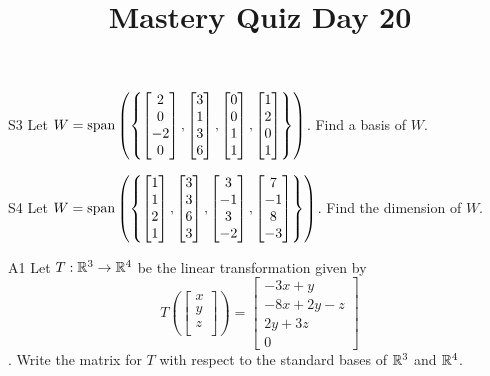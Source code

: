 \documentclass{sbgLAquiz}
\title{Mastery Quiz Day 20 }
\begin{document}
\begin{problem}{S3}
Let $W={\rm span}\left(\left\{\begin{bmatrix} 2 \\ 0 \\ -2 \\ 0 \end{bmatrix}, \begin{bmatrix} 3 \\ 1 \\ 3 \\ 6 \end{bmatrix}, \begin{bmatrix} 0 \\ 0 \\ 1 \\ 1 \end{bmatrix}, \begin{bmatrix}1 \\ 2 \\ 0 \\ 1 \end{bmatrix}\right\}\right)$.  Find a basis of $W$.
\end{problem}

\begin{problem}{S4}
Let $W = {\rm span} \left( \left\{ \begin{bmatrix} 1 \\ 1 \\ 2 \\ 1 \end{bmatrix}, \begin{bmatrix} 3 \\ 3 \\ 6 \\ 3 \end{bmatrix}, \begin{bmatrix} 3 \\ -1 \\ 3 \\ -2 \end{bmatrix}, \begin{bmatrix} 7 \\ -1 \\ 8 \\ -3 \end{bmatrix} \right\} \right)$.  Find the dimension of $W$.
\end{problem}
\newpage

\begin{problem}{A1}
Let $T: \mathbb{R}^3\rightarrow \mathbb{R}^4$ be the linear transformation given by $$T\left(\begin{bmatrix} x \\ y \\ z \\  \end{bmatrix} \right) = \begin{bmatrix} -3x+y \\ -8x+2y-z \\ 2y+3z \\ 0 \end{bmatrix}$$.  Write the matrix for $T$ with respect to the standard bases of $\mathbb{R}^3$ and $\mathbb{R}^4$.
\end{problem}
\end{document}
